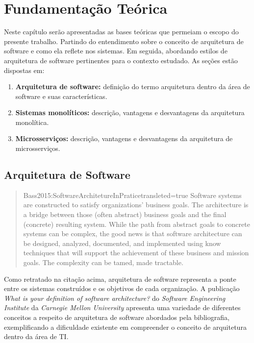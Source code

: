 \chapter{Fundamentação Teórica}

Neste capítulo serão apresentadas as bases teóricas que permeiam o escopo do presente trabalho.
Partindo do entendimento sobre o conceito de arquitetura de software e como ela reflete nos
sistemas. Em seguida, abordando estilos de arquitetura de software pertinentes para o contexto
estudado. As seções estão dispostas em:

  \begin{enumerate}
    \item \textbf{Arquitetura de software:} definição do termo arquitetura dentro da área de
        software e suas características.
    \item \textbf{Sistemas monolíticos:} descrição, vantagens e desvantagens da arquitetura monolítica.
    \item \textbf{Microsserviços:} descrição, vantagens e desvantagens da arquitetura de
        microsserviços.
  \end{enumerate}

\section{Arquitetura de Software}

\begin{quotation}{Bass2015:SoftwareArchitetureInPratice}{transleted=true}
Software systems are constructed to satisfy organizations' business goals. The architecture is a bridge between those (often abstract) business goals and the final (concrete) resulting system. While the path from abstract goals to concrete systems can be complex, the good news is that software architecture can be designed, analyzed, documented, and implemented using know techniques that will support the achievement of these business and mission goals. The complexity can be tamed, made tractable.
\end{quotation}

Como retratado na citação acima, arquitetura de software representa a ponte entre os sistemas
construídos e os objetivos de cada organização. A publicação \textit{What is your definition of
software architecture?} do \textit{Software Engineering Institute} da \textit{Carnegie Mellon
University} \cite{SEI2017:WhatIsYourSoftwareArchitectureDefinition} apresenta uma variedade de diferentes
conceitos a respeito de arquitetura de software abordados pela bibliografia, exemplificando a
dificuldade existente em compreender o conceito de arquitetura dentro da área de \gls{TI}.


